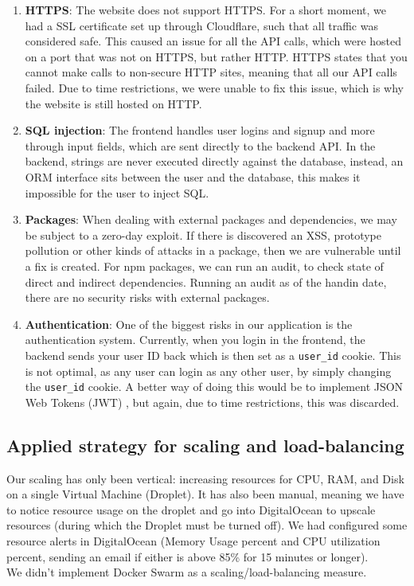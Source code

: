 \begin{enumerate}
    \item \textbf{HTTPS}: The website does not support HTTPS. For a short moment, we had a SSL certificate set up through Cloudflare, such that all traffic was considered safe. This caused an issue for all the API calls, which were hosted on a port that was not on HTTPS, but rather HTTP. HTTPS states that you cannot make calls to non-secure HTTP sites, meaning that all our API calls failed. Due to time restrictions, we were unable to fix this issue, which is why the website is still hosted on HTTP.
    \item \textbf{SQL injection}: The frontend handles user logins and signup and more through input fields, which are sent directly to the backend API. In the backend, strings are never executed directly against the database, instead, an ORM interface sits between the user and the database, this makes it impossible for the user to inject SQL. 
    \item \textbf{Packages}: When dealing with external packages and dependencies, we may be subject to a zero-day exploit. If there is discovered an XSS, prototype pollution or other kinds of attacks in a package, then we are vulnerable until a fix is created. For npm packages, we can run an audit, to check state of direct and indirect dependencies. Running an audit as of the handin date, there are no security risks with external packages.
    \item \textbf{Authentication}: One of the biggest risks in our application is the authentication system. Currently, when you login in the frontend, the backend sends your user ID back which is then set as a \verb|user_id| cookie. This is not optimal, as any user can login as any other user, by simply changing the \verb|user_id| cookie. A better way of doing this would be to implement JSON Web Tokens (JWT) \cite{jwt}, but again, due to time restrictions, this was discarded.
\end{enumerate}

\subsection{Applied strategy for scaling and load-balancing}
Our scaling has only been vertical: increasing resources for CPU, RAM, and Disk on a single Virtual Machine (Droplet). It has also been manual, meaning we have to notice resource usage on the droplet and go into DigitalOcean to upscale resources (during which the Droplet must be turned off). We had configured some resource alerts in DigitalOcean (Memory Usage percent and CPU utilization percent, sending an email if either is above 85\% for 15 minutes or longer). \\
We didn't implement Docker Swarm as a scaling/load-balancing measure.

